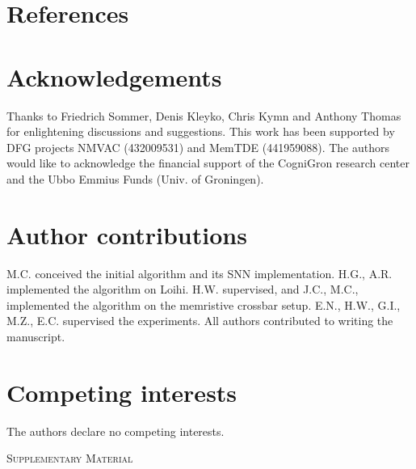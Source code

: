 \section*{References}



\printbibliography[heading=none]



\onecolumn
\newpage

\FloatBarrier

\section*{Acknowledgements}

Thanks to Friedrich Sommer, Denis Kleyko, Chris Kymn and Anthony Thomas for enlightening discussions and suggestions.
This work has been supported by DFG projects NMVAC (432009531) and MemTDE (441959088). The authors would like to acknowledge the financial support of the CogniGron research center and the Ubbo Emmius Funds (Univ. of Groningen).

\section*{Author contributions}

M.C. conceived the initial algorithm and its SNN implementation. H.G., A.R. implemented the algorithm on Loihi. H.W. supervised, and J.C., M.C., implemented the algorithm on the memristive crossbar setup. E.N., H.W., G.I., M.Z., E.C. supervised the experiments. All authors contributed to writing the manuscript.

\section*{Competing interests}
The authors declare no competing interests.

\newpage

\begin{center}
\textsc{Supplementary Material}
\end{center}


\renewcommand\thefigure{S\arabic{figure}}
\renewcommand\thesection{S\arabic{section}}
\renewcommand{\theHfigure}{S\arabic{figure}}
\renewcommand\theHsection{S\arabic{section}}

\setcounter{figure}{0}
\setcounter{section}{0}
\setcounter{equation}{0}
\setcounter{page}{1}


